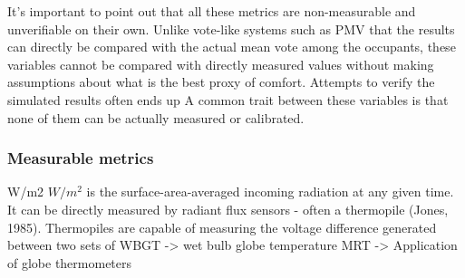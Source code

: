     It's important to point out that all these metrics are non-measurable and unverifiable on their own. Unlike vote-like systems such as PMV that the results can directly be compared with the actual mean vote among the occupants, these variables cannot be compared with directly measured values without making assumptions about what is the best proxy of comfort. 
    Attempts to verify the simulated results often ends up  
    A common trait between these variables is that none of them can be actually measured or calibrated. 
\subsubsection{Measurable metrics}
        W/m2
        $W/m^2$ is the surface-area-averaged incoming radiation at any given time. It can be directly measured by radiant flux sensors - often a thermopile (Jones, 1985). Thermopiles are capable of measuring the voltage difference generated between two sets of 
        WBGT -> wet bulb globe temperature
        MRT -> Application of globe thermometers
